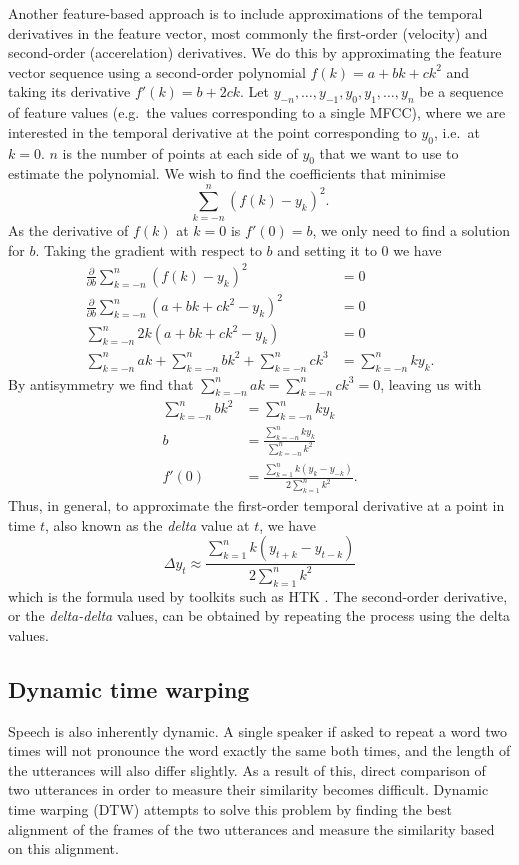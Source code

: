 Another feature-based approach is to include approximations of the temporal derivatives in the feature vector, most commonly the first-order (velocity) and second-order (accerelation) derivatives.
We do this by approximating the feature vector sequence using a second-order polynomial $f(k)=a + bk + ck^2$ and taking its derivative $f'(k)=b + 2ck$.
Let $y_{-n}, \dots, y_{-1}, y_0, y_1, \dots, y_n$ be a sequence of feature values (e.g.\ the values corresponding to a single MFCC), where we are interested in the temporal derivative at the point corresponding to $y_0$, i.e.\ at $k=0$.
$n$ is the number of points at each side of $y_0$ that we want to use to estimate the polynomial.
We wish to find the coefficients that minimise
\[
\sum_{k=-n}^n (f(k) - y_k)^2.
\]
As the derivative of $f(k)$ at $k=0$ is $f'(0) = b$, we only need to find a solution for $b$.
Taking the gradient with respect to $b$ and setting it to $0$ we have
\begin{align*}
  \frac{\partial}{\partial b} \sum_{k=-n}^n (f(k) - y_k)^2 &= 0 \\
  \frac{\partial}{\partial b} \sum_{k=-n}^n (a + bk + ck^2 - y_k)^2 &= 0 \\
  \sum_{k=-n}^n 2k(a + bk + ck^2 - y_k) &= 0 \\
  \sum_{k=-n}^n ak + \sum_{k=-n}^n bk^2 + \sum_{k=-n}^n ck^3 &= \sum_{k=-n}^n ky_k.
\end{align*}
By antisymmetry we find that $\sum_{k=-n}^n ak = \sum_{k=-n}^n ck^3 = 0$, leaving us with
\begin{align*}
  \sum_{k=-n}^n bk^2 &= \sum_{k=-n}^n ky_k \\
  b &= \frac{\sum_{k=-n}^n ky_k}{\sum_{k=-n}^n k^2} \\
  f'(0) &= \frac{\sum_{k=1}^n k(y_k - y_{-k})}{2\sum_{k=1}^n k^2}.
\end{align*}
Thus, in general, to approximate the first-order temporal derivative at a point in time $t$, also known as the \emph{delta} value at $t$, we have
\[
\Delta y_t \approx \frac{\sum_{k=1}^n k(y_{t+k} - y_{t-k})}{2 \sum_{k=1}^n k^2}
\]
which is the formula used by toolkits such as HTK \parencite{young2005htk}.
The second-order derivative, or the \emph{delta-delta} values, can be obtained by repeating the process using the delta values.

\subsection{Dynamic time warping}

Speech is also inherently dynamic.
A single speaker if asked to repeat a word two times will not pronounce the word exactly the same both times, and the length of the utterances will also differ slightly.
As a result of this, direct comparison of two utterances in order to measure their similarity becomes difficult.
Dynamic time warping (DTW) attempts to solve this problem by finding the best alignment of the frames of the two utterances and measure the similarity based on this alignment.

